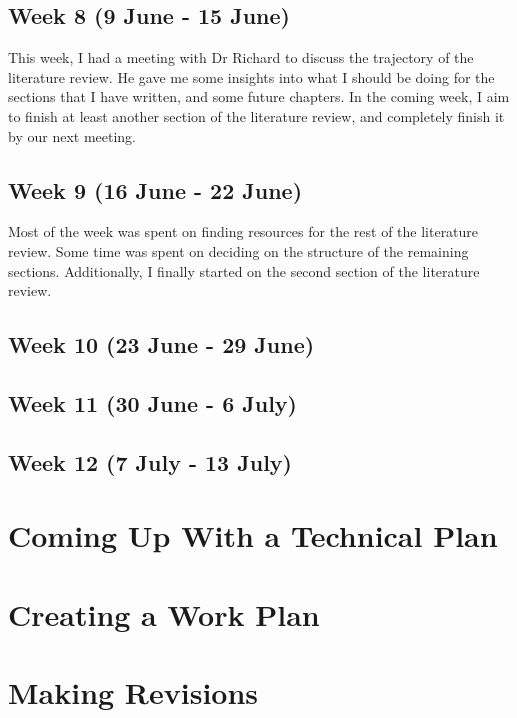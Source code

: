 \documentclass[a4paper, 12pt]{extreport}
\begin{document}
			\subsection{Week 8 (9 June - 15 June)}
				
				This week, I had a meeting with Dr Richard to discuss the trajectory of the literature review. He gave me some insights into what I should be doing for the sections that I have written, and some future chapters. In the coming week, I aim to finish at least another section of the literature review, and completely finish it by our next meeting.
				
			\subsection{Week 9 (16 June - 22 June)}
				
				Most of the week was spent on finding resources for the rest of the literature review. Some time was spent on deciding on the structure of the remaining sections. Additionally, I finally started on the second section of the literature review.
				
			\subsection{Week 10 (23 June - 29 June)}
			
			\subsection{Week 11 (30 June - 6 July)}
			
			\subsection{Week 12 (7 July - 13 July)}
		
		\section{Coming Up With a Technical Plan}
		
		\section{Creating a Work Plan}
		
		\section{Making Revisions}
		
\end{document}
